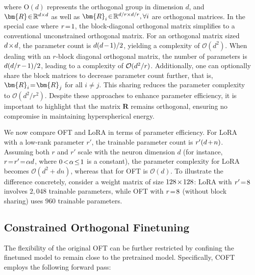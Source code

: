 where $\text{O}(d)$ represents the orthogonal group in dimension $d$, and $\thickmuskip=2mu \medmuskip=2mu \bm{R}\in\mathbb{R}^{d\times d}$ as well as $\thickmuskip=2mu \medmuskip=2mu \bm{R}_i\in\mathbb{R}^{d/r\times d/r},\forall i$ are orthogonal matrices. In the special case where $\thickmuskip=2mu \medmuskip=2mu r=1$, the block-diagonal orthogonal matrix simplifies to a conventional unconstrained orthogonal matrix. For an orthogonal matrix sized $\thickmuskip=2mu \medmuskip=2mu d\times d$, the parameter count is $\thickmuskip=2mu \medmuskip=2mu d(d-1)/2$, yielding a complexity of $\mathcal{O}(d^2)$. When dealing with an $r$-block diagonal orthogonal matrix, the number of parameters is $\thickmuskip=2mu \medmuskip=2mu d(d/r-1)/2$, leading to a complexity of $\thickmuskip=2mu \medmuskip=2mu \mathcal{O}(d^2/r)$. Additionally, one can optionally share the block matrices to decrease parameter count further, that is, $\thickmuskip=2mu \medmuskip=2mu \bm{R}_i=\bm{R}_j$ for all $i \neq j$. This sharing reduces the parameter complexity to $\mathcal{O}(d^2/r^2)$. Despite these approaches to enhance parameter efficiency, it is important to highlight that the matrix $\bm{R}$ remains orthogonal, ensuring no compromise in maintaining hyperspherical energy.

We now compare OFT and LoRA in terms of parameter efficiency. For LoRA with a low-rank parameter $r'$, the trainable parameter count is $\thickmuskip=2mu \medmuskip=2mu r'(d+n)$. Assuming both $r$ and $r'$ scale with the neuron dimension $d$ (for instance, $\thickmuskip=2mu \medmuskip=2mu r = r' = \alpha d$, where $\thickmuskip=2mu \medmuskip=2mu 0 < \alpha \leq 1$ is a constant), the parameter complexity for LoRA becomes $\mathcal{O}(d^2 + dn)$, whereas that for OFT is $\mathcal{O}(d)$. To illustrate the difference concretely, consider a weight matrix of size $\thickmuskip=2mu \medmuskip=2mu 128 \times 128$: LoRA with $\thickmuskip=2mu \medmuskip=2mu r' = 8$ involves $2,048$ trainable parameters, while OFT with $\thickmuskip=2mu \medmuskip=2mu r = 8$ (without block sharing) uses $960$ trainable parameters.

\subsection{Constrained Orthogonal Finetuning}

The flexibility of the original OFT can be further restricted by confining the finetuned model to remain close to the pretrained model. Specifically, COFT employs the following forward pass:

